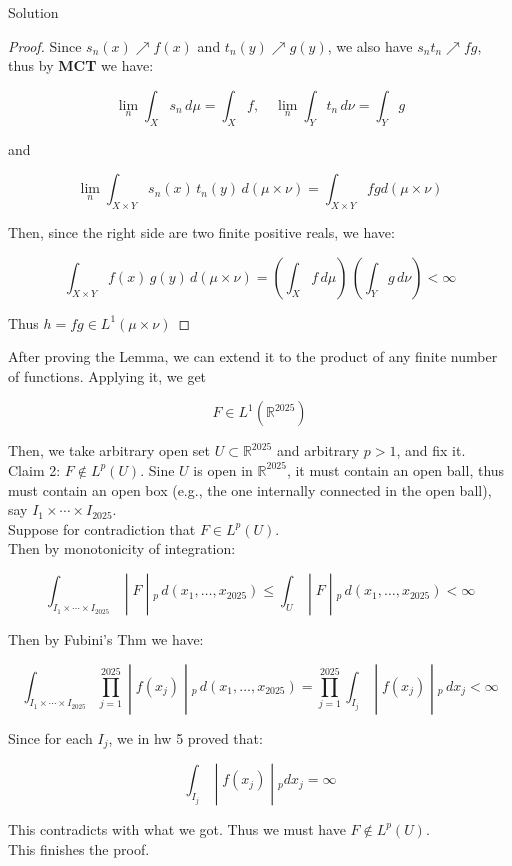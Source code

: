 \documentclass{qlnotes-export}
\begin{document}
\begin{qlsolution}{Solution}
\begin{proof}
Since \(s_{n}(x)\operatorname{\nearrow ︎}f(x)\) and \(t_{n}(y)\operatorname{\nearrow ︎}g(y)\), we also have \(s_{n}t_{n}\operatorname{\nearrow ︎}fg\), thus by \textbf{MCT} we have:

\[\lim\limits_{n}\int_{X}s_{n}\, d\mu = \int_{X}f,\quad\lim\limits_{n}\int_{Y}t_{n}\, d\nu = \int_{Y}g\]

and

\[\lim\limits_{n}\int_{X \times Y}s_{n}(x)\, t_{n}(y)\, d(\mu \times \nu) = \int_{X \times Y}fg d(\mu \times \nu)\]

Then, since the right side are two finite positive reals, we have:

\[\int_{X \times Y}f(x)\, g(y)\, d(\mu \times \nu) = (\int_{X}f\, d\mu)\,(\int_{Y}g\, d\nu) < \infty\]

Thus \(h = fg \in L^{1}(\mu \times \nu)\)

\end{proof}

After proving the Lemma, we can extend it to the product of any finite number of functions. Applying it, we get

\[F \in L^{1}({\mathbb{R}}^{2025})\]

Then, we take arbitrary open set \(U \subset {\mathbb{R}}^{2025}\) and arbitrary \(p > 1\), and fix it.\\
Claim 2: \(F \notin L^{p}(U)\). Sine \(U\) is open in \({\mathbb{R}}^{2025}\), it must contain an open ball, thus must contain an open box (e.g., the one internally connected in the open ball), say \(I_{1} \times \cdots \times I_{2025}\).\\
Suppose for contradiction that \(F \in L^{p}(U)\).\\
Then by monotonicity of integration:

\[\left. \int_{I_{1} \times \cdots \times I_{2025}} \middle| F \middle| {}_{p}\, d(x_{1},\ldots,x_{2025}) \leq \int_{U} \middle| F \middle| {}_{p}\, d(x_{1},\ldots,x_{2025}) < \infty \right.\]

Then by Fubini's Thm we have:

\[\left. \int_{I_{1} \times \cdots \times I_{2025}}\prod\limits_{j = 1}^{2025} \middle| f(x_{j}) \middle| {}_{p}\, d(x_{1},\ldots,x_{2025}) = \prod\limits_{j = 1}^{2025}\int_{I_{j}} \middle| f(x_{j}) \middle| {}_{p}\, dx_{j} < \infty \right.\]

Since for each \(I_{j}\), we in hw 5 proved that:

\[\left. \int_{I_{j}} \middle| f(x_{j}) \middle| {}_{p} dx_{j} = \infty \right.\]

This contradicts with what we got. Thus we must have \(F \notin L^{p}(U)\).\\
This finishes the proof.

\end{qlsolution}
\end{document}
